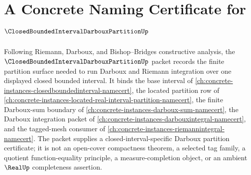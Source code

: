 \chapter{A Concrete Naming Certificate for $\ClosedBoundedIntervalDarbouxPartitionUp$}
\label{ch:concrete-instances-closed-bounded-interval-darboux-partition-namecert}

Following Riemann, Darboux, and Bishop--Bridges constructive analysis, the $\ClosedBoundedIntervalDarbouxPartitionUp$ packet records the finite partition surface needed to run Darboux and Riemann integration over one displayed closed bounded interval. It binds the base interval of \autoref{ch:concrete-instances-closedboundedinterval-namecert}, the located partition row of \autoref{ch:concrete-instances-located-real-interval-partition-namecert}, the finite Darboux-sum boundary of \autoref{ch:concrete-instances-darboux-sum-namecert}, the Darboux integration packet of \autoref{ch:concrete-instances-darbouxintegral-namecert}, and the tagged-mesh consumer of \autoref{ch:concrete-instances-riemannintegral-namecert}. The packet supplies a closed-interval-specific Darboux partition certificate; it is not an open-cover compactness theorem, a selected tag family, a quotient function-equality principle, a measure-completion object, or an ambient $\RealUp$ completeness assertion.

